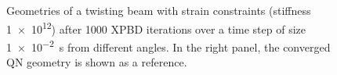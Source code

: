 \begin{figure}[h]
    \caption{Geometries of a twisting beam with strain constraints (stiffness \num{1e12}) after 1000 XPBD iterations over a time step of size \SI{1e-2}{\second} 
    from different angles. In the right panel, the converged QN geometry is shown as a reference.}
    \label{fig:twisting-beam-xpbd-failure-geometry}
\end{figure}

